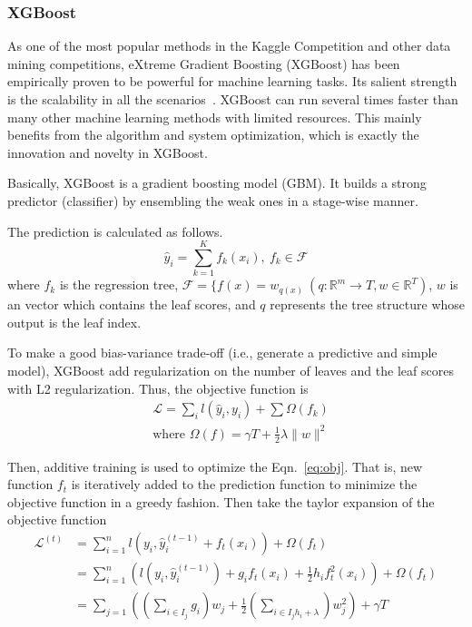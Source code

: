\subsubsection{XGBoost}
As one of the most popular methods in the Kaggle Competition and other data mining competitions, eXtreme Gradient Boosting (XGBoost) has been empirically proven to be powerful for machine learning tasks. Its salient strength is the scalability in all the scenarios~\cite{chen2016xgboost}. XGBoost can run several times faster than many other machine learning methods with limited resources. This mainly benefits from the algorithm and system optimization, which is exactly the innovation and novelty in XGBoost. 

Basically, XGBoost is a gradient boosting model (GBM). It builds a strong predictor (classifier) by ensembling the weak ones in a stage-wise manner.

The prediction is calculated as follows.
\begin{equation}
\hat{y}_i = \sum_{k=1}^K f_k(x_i),\ f_k \in \mathcal{F}
\end{equation}
where $f_k$ is the regression tree, $\mathcal{F} = \{f(x) = w_{q(x)}\ (q: \mathbb{R}^m \rightarrow T, w\in \mathbb{R}^T)$, $w$ is an vector which contains the leaf scores, and $q$ represents the tree structure whose output is the leaf index.

To make a good bias-variance trade-off (i.e., generate a predictive and simple model), XGBoost add regularization on the number of leaves and the leaf scores with L2 regularization. Thus, the objective function is
\begin{equation}
\begin{aligned}
& \mathcal{L} = \sum_i l(\hat{y}_i, y_i) + \sum \Omega(f_k) \\
&\text{where } \Omega(f) = \gamma T + \frac{1}{2}\lambda \|w\|^2
\end{aligned}
\label{eq:obj}
\end{equation}

Then, additive training is used to optimize the Eqn.~\eqref{eq:obj}. That is, new function $f_t$ is iteratively added to the prediction function to minimize the objective function in a greedy fashion. Then take the taylor expansion of the objective function
\begin{equation}
\begin{aligned}
\mathcal{L}^{(t)} & = \sum_{i=1}^n l(y_i, \hat{y}_i^{(t-1)}+f_t(x_i)) + \Omega(f_t) \\
&= \sum_{i=1}^n \left( l(y_i, \hat{y}_i^{(t-1)}) + g_if_t(x_i) + \frac{1}{2} h_i f_t^2(x_i)\right) + \Omega(f_t)\\
&= \sum_{j=1} \left((\sum_{i\in I_j} g_i)w_j + \frac{1}{2} (\sum_{i\in I_j h_i + \lambda })w_j^2\right) +\gamma T
\end{aligned}
\end{equation}

